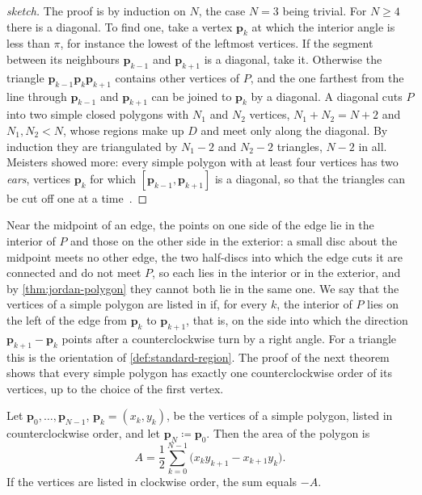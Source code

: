 \begin{proof}[sketch]
The proof is by induction on $N$, the case $N=3$ being trivial. For $N\ge4$ there is a diagonal. To find one, take a vertex $\mathbf p_k$ at which the interior angle is less than $\pi$, for instance the lowest of the leftmost vertices. If the segment between its neighbours $\mathbf p_{k-1}$ and $\mathbf p_{k+1}$ is a diagonal, take it. Otherwise the triangle $\mathbf p_{k-1}\mathbf p_k\mathbf p_{k+1}$ contains other vertices of $P$, and the one farthest from the line through $\mathbf p_{k-1}$ and $\mathbf p_{k+1}$ can be joined to $\mathbf p_k$ by a diagonal. A diagonal cuts $P$ into two simple closed polygons with $N_1$ and $N_2$ vertices, $N_1+N_2=N+2$ and $N_1,N_2<N$, whose regions make up $D$ and meet only along the diagonal. By induction they are triangulated by $N_1-2$ and $N_2-2$ triangles, $N-2$ in all. Meisters showed more: every simple polygon with at least four vertices has two \emph{ears}, vertices $\mathbf p_k$ for which $[\mathbf p_{k-1},\mathbf p_{k+1}]$ is a diagonal, so that the triangles can be cut off one at a time~\cite{meisters1975}.
\end{proof}

Near the midpoint of an edge, the points on one side of the edge lie in the interior of $P$ and those on the other side in the exterior: a small disc about the midpoint meets no other edge, the two half-discs into which the edge cuts it are connected and do not meet $P$, so each lies in the interior or in the exterior, and by \cref{thm:jordan-polygon} they cannot both lie in the same one. We say that the vertices of a simple polygon are listed in  if, for every $k$, the interior of $P$ lies on the left of the edge from $\mathbf p_k$ to $\mathbf p_{k+1}$, that is, on the side into which the direction $\mathbf p_{k+1}-\mathbf p_k$ points after a counterclockwise turn by a right angle. For a triangle this is the orientation of \cref{def:standard-region}. The proof of the next theorem shows that every simple polygon has exactly one counterclockwise order of its vertices, up to the choice of the first vertex.

\begin{theorem}
\label{thm:shoelace}
Let $\mathbf p_0,\ldots,\mathbf p_{N-1}$, $\mathbf p_k=(x_k,y_k)$, be the vertices of a simple polygon, listed in counterclockwise order, and let $\mathbf p_N\coloneqq\mathbf p_0$. Then the area of the polygon is
\[
A=\frac12\sum_{k=0}^{N-1}\bigl(x_ky_{k+1}-x_{k+1}y_k\bigr).
\]
If the vertices are listed in clockwise order, the sum equals $-A$.
\end{theorem}

